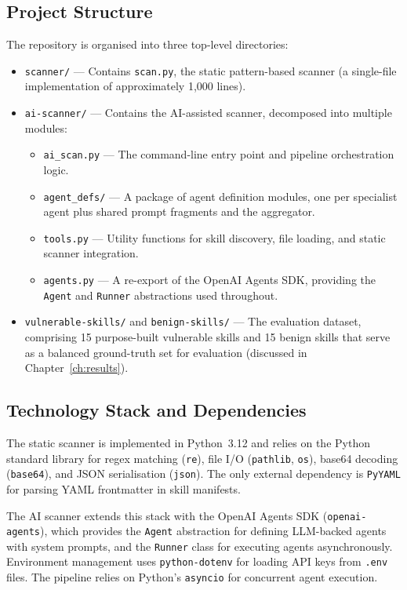 \subsection{Project Structure}

The repository is organised into three top-level directories:

\begin{itemize}
    \item \texttt{scanner/} --- Contains \texttt{scan.py}, the static pattern-based scanner (a single-file implementation of approximately 1{,}000 lines).
    \item \texttt{ai-scanner/} --- Contains the AI-assisted scanner, decomposed into multiple modules:
    \begin{itemize}
        \item \texttt{ai\_scan.py} --- The command-line entry point and pipeline orchestration logic.
        \item \texttt{agent\_defs/} --- A package of agent definition modules, one per specialist agent plus shared prompt fragments and the aggregator.
        \item \texttt{tools.py} --- Utility functions for skill discovery, file loading, and static scanner integration.
        \item \texttt{agents.py} --- A re-export of the OpenAI Agents SDK, providing the \texttt{Agent} and \texttt{Runner} abstractions used throughout.
    \end{itemize}
    \item \texttt{vulnerable-skills/} and \texttt{benign-skills/} --- The evaluation dataset, comprising 15 purpose-built vulnerable skills and 15 benign skills that serve as a balanced ground-truth set for evaluation (discussed in Chapter~\ref{ch:results}).
\end{itemize}

\subsection{Technology Stack and Dependencies}

The static scanner is implemented in Python~3.12 and relies on the Python standard library for regex matching (\texttt{re}), file I/O (\texttt{pathlib}, \texttt{os}), base64 decoding (\texttt{base64}), and JSON serialisation (\texttt{json}). The only external dependency is \texttt{PyYAML} for parsing YAML frontmatter in skill manifests.

The AI scanner extends this stack with the OpenAI Agents SDK (\texttt{openai-agents}), which provides the \texttt{Agent} abstraction for defining LLM-backed agents with system prompts, and the \texttt{Runner} class for executing agents asynchronously. Environment management uses \texttt{python-dotenv} for loading API keys from \texttt{.env} files. The pipeline relies on Python's \texttt{asyncio} for concurrent agent execution.

